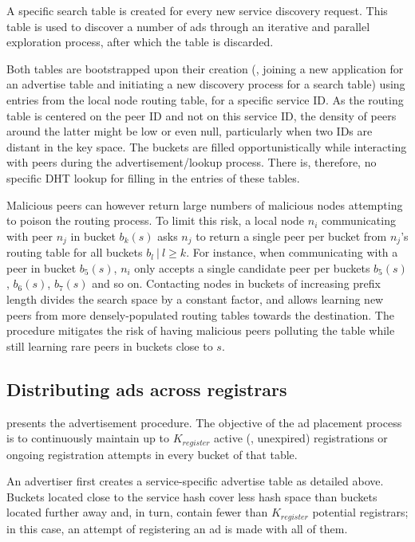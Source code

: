 A specific search table is created for every new service discovery request.
This table is used to discover a number of ads through an iterative and parallel exploration process, after which the table is discarded.

Both tables are bootstrapped upon their creation (\ie, joining a new application for an advertise table and initiating a new discovery process for a search table) using entries from the local node routing table, for a specific service ID.
As the routing table is centered on the peer ID and not on this service ID, the density of peers around the latter might be low or even null, particularly when two IDs are distant in the key space.
The buckets are filled opportunistically while interacting with peers during the advertisement/lookup process.
There is, therefore, no specific DHT lookup for filling in the entries of these tables.

Malicious peers can however return large numbers of malicious nodes attempting to poison the routing process. To limit this risk, a local node $n_i$ communicating with peer $n_j$ in bucket $b_k(s)$ asks $n_j$ to return a single peer per bucket from $n_j$'s routing table for all buckets $b_l \:|\: l \geq k$. For instance, when communicating with a peer in bucket $b_{5}(s)$, $n_i$ only accepts a single candidate peer per buckets $b_5(s)$, $b_6(s)$, $b_7(s)$ and so on. Contacting nodes in buckets of increasing prefix length divides the search space by a constant factor, and allows learning new peers from more densely-populated routing tables towards the destination. The procedure mitigates the risk of having malicious peers polluting the table while still learning rare peers in buckets close to $s$. 


\subsection{Distributing ads across registrars}
\label{sec:registration_multi}


 presents the advertisement procedure. The objective of the ad placement process is to continuously maintain up to $K_\textit{register}$ active (\ie, unexpired) registrations or ongoing registration attempts in every bucket of that table. 


An advertiser first creates a service-specific advertise table as detailed above.
Buckets located close to the service hash cover less hash space than buckets located further away and, in turn, contain fewer than $K_\textit{register}$ potential registrars; in this case, an attempt of registering an ad is made with all of them.

